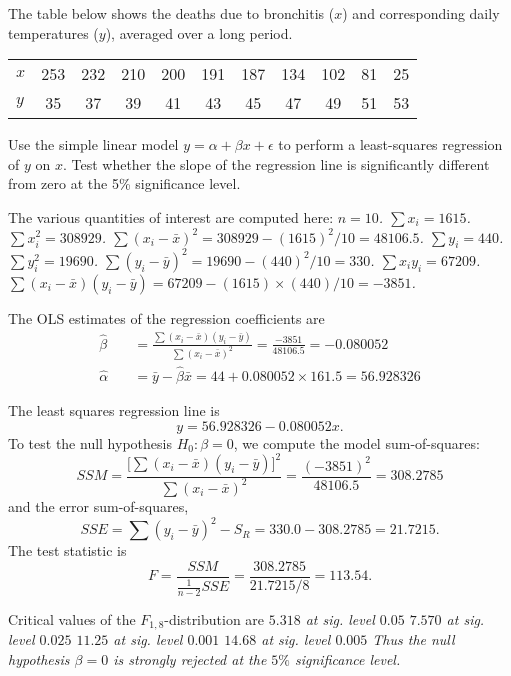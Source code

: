 \begin{exercise}
The table below shows the deaths due to bronchitis ($x$) and corresponding daily temperatures ($y$), averaged over a long period.
\begin{center}
\begin{tabular}{lcccccccccc}\hline
$x$ & 253 & 232 & 210 & 200 & 191 & 187 & 134 & 102 & 81 & 25 \\
$y$ & 35 & 37 & 39 & 41 & 43 & 45 & 47 & 49 & 51 & 53 \\ \hline
\end{tabular}
\end{center}
Use the simple linear model $y = \alpha + \beta x + \epsilon$ to perform a least-squares regression of $y$ on $x$. Test whether the slope of the regression line is significantly different from zero at the 5\% significance level.
\begin{answer}
The various quantities of interest are computed here:
\bit
\it $n = 10$.
\it $\sum x_{i} = 1615$.
\it $\sum x_{i}^{2}	= 308929$.
\it $\sum (x_i-\bar{x})^2	= 308929 - (1615)^{2}/10 = 48106.5$.
\it $\sum y_{i} =  440$.
\it $\sum y_{i}^{2}  = 19690$.
\it $\sum (y_i-\bar{y})^2 = 19690 - (440)^{2}/10 = 330$.
\it $\sum x_{i}y_{i}	= 67209$.
\it $\sum (x_i-\bar{x})(y_i-\bar{y})	= 67209 - (1615){\times}(440)/10 = -3851$.
\eit

The OLS estimates of the regression coefficients are
\begin{align*}
\hat{\beta}		&\quad = \frac{\sum (x_i-\bar{x})(y_i-\bar{y})}{\sum (x_i-\bar{x})^2} = \frac{-3851}{48106.5} = -0.080052 \\
\hat{\alpha}	&\quad = \bar{y}-\hat{\beta}\bar{x} = 44 + 0.080052{\times}161.5 = 56.928326
\end{align*}

The least squares regression line is 
\[
y = 56.928326 - 0.080052x.
\]
To test the null hypothesis $H_0:\beta=0$, we compute the model sum-of-squares:
\[
SSM 
	= \frac{\big[\sum (x_i-\bar{x})(y_i-\bar{y})\big]^{2}}{\sum (x_i-\bar{x})^2} 
	=\frac{(-3851)^{2}}{48106.5} 
	= 308.2785
\]
and the error sum-of-squares,
\[
SSE
	= \sum (y_i-\bar{y})^2 - S_R = 330.0 - 308.2785 =  21.7215.
\]
The test statistic is
\[
F = \frac{SSM}{\frac{1}{n-2}SSE} = \frac{308.2785}{21.7215/8} = 113.54.
\]

Critical values of the $F_{1,8}$-distribution are
\bit
\it $5.318$ at sig. level $0.05$
\it $7.570$ at sig. level $0.025$
\it $11.25$ at sig. level $0.001$
\it $14.68$ at sig. level $0.005$
\eit
Thus the null hypothesis ${\beta} = 0$ is strongly rejected at the $5\%$ significance level.
\end{answer}
\end{exercise}


